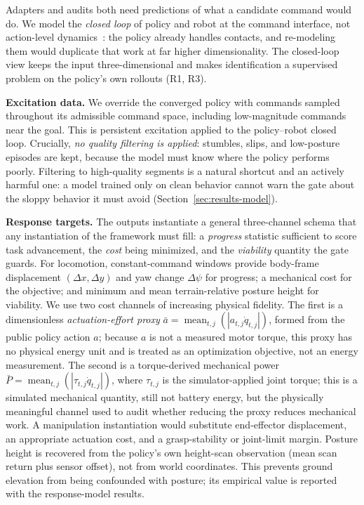 \documentclass{article}
\begin{document}
Adapters and audits both need predictions of what a candidate command would do.
We model the \emph{closed loop} of policy and robot at the command interface,
not action-level dynamics~\citep{nagabandi2018neural}: the policy already handles
contacts, and re-modeling them would duplicate that work at far higher
dimensionality. The closed-loop view keeps the input three-dimensional and makes
identification a supervised problem on the policy's own rollouts (R1, R3).

\textbf{Excitation data.}
We override the converged policy with commands sampled throughout its admissible
command space, including low-magnitude commands near the goal. This is persistent
excitation applied to the policy--robot closed loop.
Crucially, \emph{no quality filtering is applied}: stumbles, slips, and low-posture
episodes are kept, because the model must know where the policy performs poorly.
Filtering to high-quality segments is a natural shortcut and an actively harmful
one: a model trained only on clean behavior cannot warn the gate about the sloppy
behavior it must avoid (Section~\ref{sec:results-model}).

\textbf{Response targets.}
The outputs instantiate a general three-channel schema that any instantiation of
the framework must fill: a \emph{progress} statistic sufficient to score task
advancement, the \emph{cost} being minimized, and the \emph{viability} quantity
the gate guards.
For locomotion, constant-command windows provide body-frame displacement
$(\Delta x, \Delta y)$ and yaw change $\Delta\psi$ for progress; a mechanical cost
for the objective; and minimum and mean terrain-relative posture height for
viability.
We use two cost channels of increasing physical fidelity. The first is a
dimensionless \emph{actuation-effort proxy}
$\bar{a}=\operatorname{mean}_{t,j}(|a_{t,j}\dot q_{t,j}|)$, formed from the public
policy action $a$; because $a$ is not a measured motor torque, this proxy has no
physical energy unit and is treated as an optimization objective, not an energy
measurement. The second is a torque-derived mechanical power
$\bar P=\operatorname{mean}_{t,j}(|\tau_{t,j}\dot q_{t,j}|)$, where $\tau_{t,j}$ is
the simulator-applied joint torque; this is a simulated mechanical quantity, still
not battery energy, but the physically meaningful channel used to audit whether
reducing the proxy reduces mechanical work.
A manipulation instantiation would substitute end-effector displacement, an
appropriate actuation cost, and a grasp-stability or joint-limit margin.
Posture height is recovered from the policy's own height-scan observation (mean
scan return plus sensor offset), not from world coordinates. This prevents ground
elevation from being confounded with posture; its empirical value is reported with
the response-model results.
\end{document}

